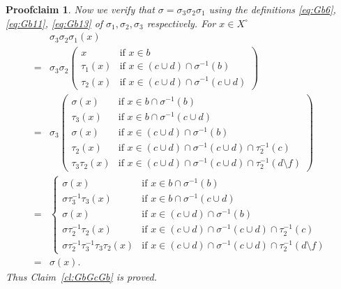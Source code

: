 \documentclass[10pt,a4paper]{amsart}
\newtheorem{proofclaim}{Proofclaim}
\begin{document}
\begin{proofclaim}
 Now we verify that $\sigma=\sigma_3\sigma_2\sigma_1$ using the definitions \eqref{eq:Gb6}, \eqref{eq:Gb11}, \eqref{eq:Gb13}
 of $\sigma_1,\sigma_2,\sigma_3$ respectively.
 For $x\in X^\circ$
 \begin{align*}
 &\sigma_3\sigma_2\sigma_1(x)
 \\
 =&
 \sigma_3\sigma_2\left( 
 \begin{array}{ll}
 x & \text{if } x\in b\\
 \tau_1(x) & \text{if } x\in (c\cup d)\cap \sigma^{-1}(b)\\
 \tau_2(x) & \text{if } x\in (c\cup d)\cap \sigma^{-1}(c\cup d)
 \end{array}
 \right)
 \\
 =&
 \sigma_3\left(\begin{array}{ll}
 \sigma(x) & \text{if } x\in b\cap \sigma^{-1}(b)\\
 \tau_3(x) & \text{if } x\in b\cap \sigma^{-1}(c\cup d)\\
 \sigma(x) & \text{if } x\in (c\cup d)\cap \sigma^{-1}(b)\\
 \tau_2(x) & \text{if } x\in (c\cup d)\cap \sigma^{-1}(c\cup d) \cap \tau_2^{-1}(c)\\
 \tau_3\tau_2(x) &\text{if } x\in (c\cup d)\cap \sigma^{-1}(c\cup d)\cap \tau_2^{-1}(d\setminus f)
 \end{array}\right)
 \\
 =&
 \begin{cases}
 \sigma(x) & \text{if } x\in b\cap \sigma^{-1}(b)\\
 \sigma\tau_3^{-1}\tau_3(x) & \text{if } x\in b\cap \sigma^{-1}(c\cup d)\\
 \sigma(x) & \text{if } x\in (c\cup d)\cap \sigma^{-1}(b)\\
 \sigma\tau_2^{-1}\tau_2(x) & \text{if } x\in (c\cup d)\cap \sigma^{-1}(c\cup d)\cap \tau_2^{-1}(c)\\
 \sigma\tau_2^{-1}\tau_3^{-1}\tau_3\tau_2(x) & \text{if } 
 x\in (c\cup d)\cap \sigma^{-1}(c\cup d)\cap \tau_2^{-1}(d\setminus f)
 \end{cases}
 \\
 =& \sigma(x).
 \end{align*}
Thus Claim~\ref{cl:GbGcGb} is proved.
\end{proofclaim}
\end{document}
